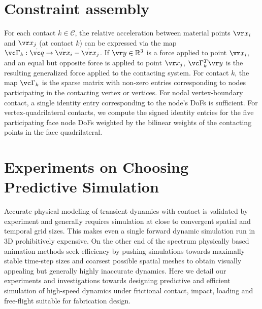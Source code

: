 \section{Constraint assembly}
\label{sec:constraint_assembly}

For each contact $k \in \mathcal C$, the relative acceleration between material points $\vr x_i$ and $\vr x_j$ (at contact $k$) can be expressed via the map $\vc \Gamma_k: \dot{\vc q} \rightarrow \dot{\vr x}_i - \dot{\vr x}_j$. If $\vr y \in \mathbb{R}^3$ is a force applied to point $\vr x_i$, and an equal but opposite force is applied to point $\vr x_j$, $ \vc \Gamma_k ^T \vr y$ is the resulting generalized force applied to the contacting system.
%
For contact $k$, the map $\vc \Gamma_k$ is the sparse matrix with non-zero entries corresponding to nodes participating in the contacting vertex or vertices.
%
For nodal vertex-boundary contact, a single identity entry corresponding to the node's DoFs is sufficient. For vertex-quadrilateral contacts, we compute the signed identity entries for the five participating face node DoFs weighted by the bilinear weights of the contacting points in the face quadrilateral.
\section{Experiments on Choosing Predictive Simulation}
Accurate physical modeling of transient dynamics with contact is validated by experiment and generally requires simulation at close to convergent spatial and temporal grid sizes. This makes even a single forward dynamic simulation run in 3D prohibitively expensive. 
On the other end of the spectrum physically based animation methods seek efficiency by pushing simulations towards maximally stable time-step sizes and coarsest possible spatial meshes to obtain visually appealing but generally highly inaccurate dynamics.
Here we detail our experiments and investigations towards designing predictive and efficient simulation of high-speed dynamics under frictional contact, impact, loading and free-flight suitable for fabrication design.
